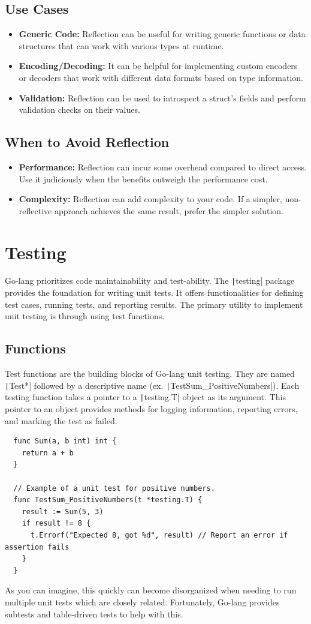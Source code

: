 \documentclass[letterpaper,12pt]{article}
\begin{document}
\subsection*{Use Cases}
\begin{itemize}
  \item \textbf{Generic Code:} Reflection can be useful for writing generic functions or data structures that can work with various types at runtime.
  \item \textbf{Encoding/Decoding:} It can be helpful for implementing custom encoders or decoders that work with different data formats based on type information.
  \item \textbf{Validation:} Reflection can be used to introspect a struct's fields and perform validation checks on their values.
\end{itemize}
\subsection*{When to Avoid Reflection}
\begin{itemize}
  \item \textbf{Performance:} Reflection can incur some overhead compared to direct access. Use it judiciously when the benefits outweigh the performance cost.
  \item \textbf{Complexity:} Reflection can add complexity to your code. If a simpler, non-reflective approach achieves the same result, prefer the simpler solution.
\end{itemize}
\section{Testing}
Go-lang prioritizes code maintainability and test-ability. The \texttt|testing| package provides the foundation for writing unit tests. It offers functionalities for defining test cases, running tests, and reporting results. The primary utility to implement unit testing is through using test functions.
\subsection{Functions}
Test functions are the building blocks of Go-lang unit testing. They are named \texttt|Test*| followed by a descriptive name (ex. \texttt|TestSum_PositiveNumbers|). Each testing function takes a pointer to a \texttt|testing.T| object as its argument. This pointer to an object provides methods for logging information, reporting errors, and marking the test as failed.
\begin{verbatim}
  func Sum(a, b int) int {
    return a + b
  }

  // Example of a unit test for positive numbers.
  func TestSum_PositiveNumbers(t *testing.T) {
    result := Sum(5, 3)
    if result != 8 {
      t.Errorf("Expected 8, got %d", result) // Report an error if assertion fails
    }
  }
\end{verbatim}
As you can imagine, this quickly can become disorganized when needing to run multiple unit tests which are closely related. Fortunately, Go-lang provides subtests and table-driven tests to help with this. 
\end{document}
